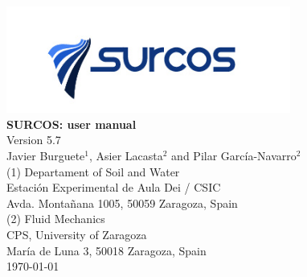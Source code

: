 \documentclass[11pt, twoside, openany, a4paper]{book}
\begin{document}

\nocite{*}




\pagestyle{empty}

\begin{titlepage} 
\begin{center} 
 
\includegraphics*[height=3.5cm]{images/logo_surcos.png}\\ 

\vspace*{3.5cm} 
{\Huge \textbf{SURCOS: user manual\\}}
\vspace*{1cm} 
{\normalsize Version 5.7}\\
\vspace*{1cm} 
{\Large Javier Burguete$^1$, Asier Lacasta$^2$ and Pilar García-Navarro$^2$}\\ 
\vspace*{2.5cm} 
{\normalsize (1) Departament of Soil and Water}\\
{Estación Experimental de Aula Dei / CSIC}\\ 
{Avda. Montañana 1005, 50059 Zaragoza, Spain}\\ 
\vspace*{1cm} 
{\normalsize (2) Fluid Mechanics}\\ 
{CPS, University of Zaragoza}\\ 
{María de Luna 3, 50018 Zaragoza, Spain}\\
\vspace*{1cm} 
{\normalsize \today}\\ 
\end{center} 
\end{titlepage} 
\cleardoublepage

\pagestyle{plain}

\tableofcontents
\listoffigures

\cleardoublepage

\pagestyle{headings}


\cleardoublepage


\cleardoublepage



%
\end{document}

